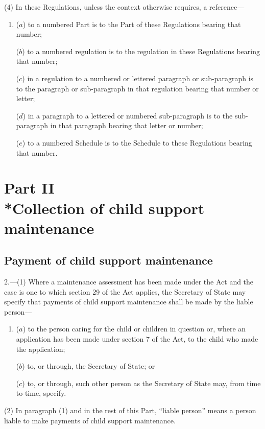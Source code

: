 \documentclass[12pt,a4paper]{article}
\begin{document}
(4) In these Regulations, unless the context otherwise requires, a reference—
\begin{enumerate}\item[]
($a$) to a numbered Part is to the Part of these Regulations bearing that number;

($b$) to a numbered regulation is to the regulation in these Regulations bearing that number;

($c$) in a regulation to a numbered or lettered paragraph or sub-paragraph is to the paragraph or sub-paragraph in that regulation bearing that number or letter;

($d$) in a paragraph to a lettered or numbered sub-paragraph is to the sub-paragraph in that paragraph bearing that letter or number;

($e$) to a numbered Schedule is to the Schedule to these Regulations bearing that number.
\end{enumerate}

\section[Part II --- Collection of child support maintenance]{Part II\\*Collection of child support maintenance}

\renewcommand\parthead{--- Part II}

\subsection[2. Payment of child support maintenance]{Payment of child support maintenance}

2.—(1) Where a maintenance assessment has been made under the Act and the case is one to which section 29 of the Act applies, the Secretary of State may specify that payments of child support maintenance shall be made by the liable person—
\begin{enumerate}\item[]
($a$) to the person caring for the child or children in question or, where an application has been made under section 7 of the Act, to the child who made the application;

($b$) to, or through, the Secretary of State; or

($c$) to, or through, such other person as the Secretary of State may, from time to time, specify.
\end{enumerate}

(2) In paragraph (1) and in the rest of this Part, “liable person” means a person liable to make payments of child support maintenance.
\end{document}
